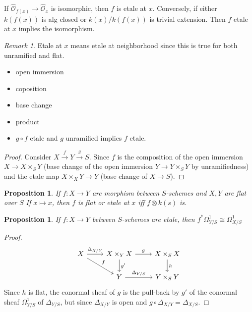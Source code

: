 \documentclass[leqno]{amsart}
\newcommand{\oo}{\mathcal O}
\newcommand{\1}{\mathbf{1}}
\newtheorem{prop}[thm]{Proposition}
\theoremstyle{definition}
\theoremstyle{remark}
\newtheorem{rem}[thm]{Remark}
\begin{document}
If $ \hat{\oo}_{f(x)}\to \hat{\oo}_x$
is isomorphic, then $f$ is etale at  $x$.
Conversely, if either
$k(f(x))$ is alg closed or $k(x)/k(f(x))$
is trivial extension.
Then  $f$ etale at  $x$ implies
the isomorphism.
 
 \begin{rem}
	Etale at $x$ means etale
	at neighborhood since this is true
	for both unramified and flat.
\end{rem}

\begin{itemize}
	\item open immersion
	\item coposition
	\item base change
	\item product
	\item $g\circ f$ etale
		and  $g$ unramified 
		implies  $f$ etale.
\end{itemize}
\begin{proof}
	Consider 
	$X\xrightarrow{f}Y\xrightarrow{g}S$.
	Since  $f$ is the composition of
	the open immersion
	$X\to X\times_SY$
	(base change of the open immersion
	$Y\to Y\times_SY$ by unramifiedness)
	and the etale map
	 $X\times_XY\to Y$
	 (base change of  $X\to S$).
\end{proof}

\begin{prop}
	If $f\colon X\to Y$
	are morphism between  $S$-schemes
	and  $X,Y$ are flat over  $S$
	If  $x\mapsto x$,
	then  $f$ is flat or etale at  $x$
	iff  $f\otimes k(s)$ is.
\end{prop}

\begin{prop}
	If $f:X\to Y$
	between  $S$-schemes are etale,
	then $f^*\Omega^1_{Y/S}\cong \Omega^1_{X/S}$
\end{prop}
\begin{proof}
	\[
		\begin{tikzcd}
			X\arrow[r,"\Delta_{X/Y}"]
			\arrow[dr,"f"] &
			X\times_YX
			\arrow[r,"g"]
			\arrow[d,"g'"] &
			X\times_SX \arrow[d,"h"]\\
		   & Y\arrow[r,"\Delta_{Y/S}"] &
		   Y\times_SY
		\end{tikzcd}
	\]
Since $h$ is flat, the conormal sheaf of  $g$
is the pull-back by  $g'$
of the conormal sheaf $\Omega^1_{Y/S}$ 
of $\Delta_{Y/S}$,
but since $\Delta_{X/Y}$ is open 
and $g\circ \Delta_{X/Y}=\Delta_{X/S}$.
\end{proof}
\end{document}
